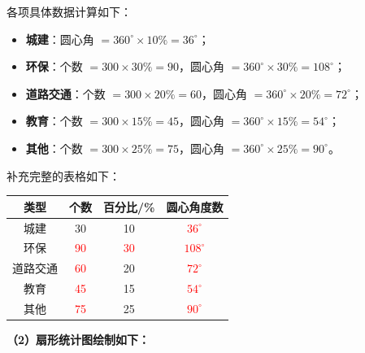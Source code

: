 \documentclass[12pt, a4paper]{ctexrep}
\begin{document}
各项具体数据计算如下：
\begin{itemize}
    \item \textbf{城建}：圆心角 $= 360^\circ \times 10\% = 36^\circ$；
    \item \textbf{环保}：个数 $= 300 \times 30\% = 90$，圆心角 $= 360^\circ \times 30\% = 108^\circ$；
    \item \textbf{道路交通}：个数 $= 300 \times 20\% = 60$，圆心角 $= 360^\circ \times 20\% = 72^\circ$；
    \item \textbf{教育}：个数 $= 300 \times 15\% = 45$，圆心角 $= 360^\circ \times 15\% = 54^\circ$；
    \item \textbf{其他}：个数 $= 300 \times 25\% = 75$，圆心角 $= 360^\circ \times 25\% = 90^\circ$。
\end{itemize}

补充完整的表格如下：

\begin{center}
\renewcommand{\arraystretch}{1.5}
\begin{tabular}{|c|c|c|c|}
\hline
\rowcolor{gray!25}
类型 & 个数 & 百分比/\% & 圆心角度数 \\
\hline
城建 & 30 & 10 & \textcolor{red}{$36^\circ$} \\
\hline
环保 & \textcolor{red}{90} & \textcolor{red}{30} & \textcolor{red}{$108^\circ$} \\
\hline
道路交通 & \textcolor{red}{60} & 20 & \textcolor{red}{$72^\circ$} \\
\hline
教育 & \textcolor{red}{45} & 15 & \textcolor{red}{$54^\circ$} \\
\hline
其他 & \textcolor{red}{75} & 25 & \textcolor{red}{$90^\circ$} \\
\hline
\end{tabular}
\end{center}

\vspace{0.4cm}
\textbf{（2）扇形统计图绘制如下：}
\end{document}
